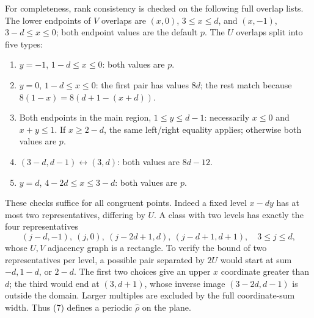 \documentclass[11pt]{article}
\begin{document}
For completeness, rank consistency is checked on the following full
overlap lists. The lower endpoints of $V$ overlaps are $(x,0)$,
$3\le x\le d$, and $(x,-1)$, $3-d\le x\le0$; both endpoint
values are the default $p$. The $U$ overlaps split into five types:
\begin{enumerate}
\item $y=-1$, $1-d\le x\le0$: both values are $p$.
\item $y=0$, $1-d\le x\le0$: the first pair has values $8d$;
the rest match because $8(1-x)=8(d+1-(x+d))$.
\item Both endpoints in the main region, $1\le y\le d-1$:
necessarily $x\le0$ and $x+y\le1$. If $x\ge2-d$, the same
left/right equality applies; otherwise both values are $p$.
\item $(3-d,d-1)\leftrightarrow(3,d)$: both values are $8d-12$.
\item $y=d$, $4-2d\le x\le3-d$: both values are $p$.
\end{enumerate}
These checks suffice for all congruent points. Indeed a fixed level
$x-dy$ has at most two representatives, differing by $U$. A class with
two levels has exactly the four representatives
\[
 (j-d,-1),\ (j,0),\ (j-2d+1,d),\ (j-d+1,d+1),\quad 3\le j\le d,
\]
whose $U,V$ adjacency graph is a rectangle. To verify the bound of two
representatives per level, a possible pair separated by $2U$ would start
at sum $-d,1-d$, or $2-d$. The first two choices give an upper
$x$ coordinate greater than $d$; the third would end at $(3,d+1)$,
whose inverse image $(3-2d,d-1)$ is outside the domain. Larger multiples
are excluded by the full coordinate-sum width. Thus (7) defines a
periodic $\widehat\rho$ on the plane.
\end{document}
